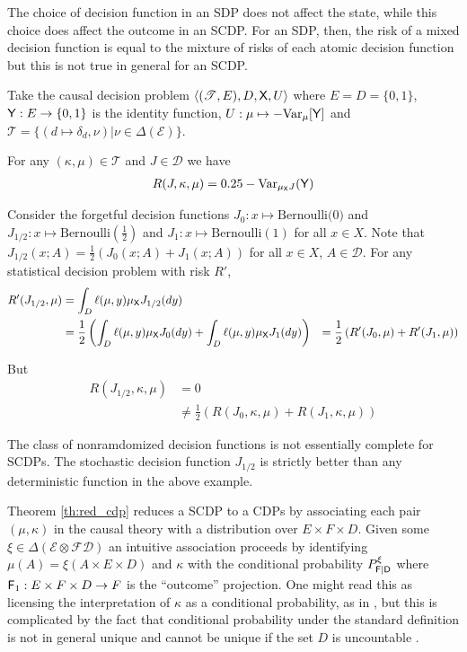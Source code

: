 \begin{example}
The choice of decision function in an SDP does not affect the state, while this choice does affect the outcome in an SCDP. For an SDP, then, the risk of a mixed decision function is equal to the mixture of risks of each atomic decision function but this is not true in general for an SCDP.

Take the causal decision problem $\langle (\mathscr{T}, E), D, \mathsf{X}, U \rangle$ where $E=D=\{0,1\}$, $\mathsf{Y}:E\to \{0,1\}$ is the identity function, $U:\mu\mapsto -\text{Var}_\mu[\mathsf{Y}]$ and $\mathscr{T}=\{(d\mapsto \delta_d,\nu)|\nu\in \Delta(\mathcal{E})\}$.

For any $(\kappa,\mu)\in \mathscr{T}$ and $J\in\mathscr{D}$ we have
\begin{align}
    R(J,\kappa,\mu) = 0.25-\text{Var}_{\mu_{\mathsf{X}} J}(\mathsf{Y})
\end{align}

Consider the forgetful decision functions $J_0:x\mapsto \text{Bernoulli(0)}$ and $J_{1/2}:x\mapsto \mathrm{Bernoulli(\tfrac{1}{2})}$ and $J_1:x\mapsto \mathrm{Bernoulli(1)}$ for all $x\in X$. Note that $J_{1/2}(x;A) = \tfrac{1}{2}(J_0(x;A)+J_1(x;A))$ for all $x\in X$, $A\in \mathcal{D}$. For any statistical decision problem with risk $R'$,
\begin{align}
    R'(J_{1/2},\mu) &= \int_D \ell(\mu,y) \mu_{\mathsf{X}} J_{1/2}(dy)\\
                    &= \frac{1}{2}\left(\int_D \ell(\mu,y) \mu_{\mathsf{X}} J_{0}(dy) + \int_D \ell(\mu,y) \mu_{\mathsf{X}} J_{1}(dy)\right)
                    &= \frac{1}{2}\left(R'(J_0,\mu) + R'(J_1,\mu) \right)
\end{align}

But
\begin{align}
    R(J_{1/2},\kappa,\mu) &= 0\\
                          &\neq \frac{1}{2}\left(R(J_0,\kappa,\mu) + R(J_1,\kappa,\mu)\right)
\end{align}

\end{example}

\begin{corollary}
The class of nonramdomized decision functions is not essentially complete for SCDPs. The stochastic decision function $J_{1/2}$ is strictly better than any deterministic function in the above example.
\end{corollary}

Theorem \ref{th:red_cdp} reduces a SCDP to a CDPs by associating each pair $(\mu,\kappa)$ in the causal theory with a distribution over $E\times F\times D$. Given some $\xi\in \Delta(\mathcal{E}\otimes\mathcal{F} \mathcal{D})$ an intuitive association proceeds by identifying $\mu(A)=\xi(A\times E\times D)$ and $\kappa$ with the conditional probability $P^\xi_{\mathsf{F}|\mathsf{D}}$ where $\mathsf{F}_1:E\times F\times D\to F$ is the ``outcome'' projection. One might read this as licensing the interpretation of $\kappa$ as a conditional probability, as in \cite{dawid_beware_2010}, but this is complicated by the fact that conditional probability under the standard definition is not in general unique and cannot be unique if the set $D$ is uncountable \cite{hajek_what_2003}. 

